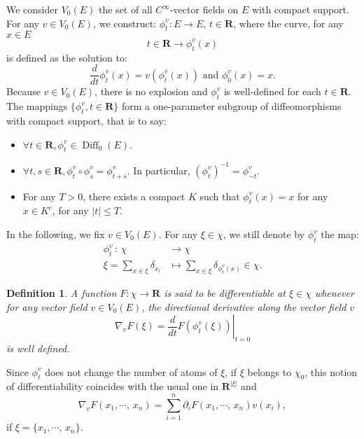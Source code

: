 \documentclass[11pt,a4paper]{amsart}
\newtheorem{Definition}{Definition}
\begin{document}
We consider $V_0(E)$ the set of all $C^{\infty}$-vector fields on $E$
with compact support. For any $v \in V_0(E)$, we construct: $\phi_t^v
: E \rightarrow E$, $t \in {{\mathbf R}}$, where the curve, for any $x \in E$
\begin{equation*}
  t \in {{\mathbf R}} \rightarrow \phi_t^v(x) 
\end{equation*}
is defined as the solution to:
\begin{equation*}
  \frac{d}{dt}\phi_t^v(x)=v(\phi^v_t(x)) \text{ and } \phi_0^v(x)=x.
\end{equation*}
Because $v \in V_0(E)$, there is no explosion and $\phi_t^v$ is
well-defined for each $t \in {{\mathbf R}}$. The mappings $\{\phi_t^v, t \in
{{\mathbf R}}\}$ form a one-parameter subgroup of diffeomorphisms with compact
support, that is to say:
\begin{itemize}
\item $\forall t \in {{\mathbf R}}, \phi_t^v \in {\operatorname{Diff}} _0(E)$.
\item $\forall t,s \in {{\mathbf R}}, \phi_t^v \circ \phi_s^v = \phi_{t+s}^v$. In
  particular, $(\phi_t^v)^{-1}=\phi_{-t}^v$.
\item For any $T>0$, there exists a compact $K$ such that
  $\phi_t^v(x)=x$ for any $x\in K^c$, for any $|t|\le T.$
\end{itemize}
In the following, we fix $v \in V_0(E)$. For any $\xi \in \chi$, we
still denote by $\phi_t^v$ the map:
\begin{align*}
  \phi_t^v\, :\, \chi & \longrightarrow \chi\\
  \xi=\sum_{x \in \xi}\delta_{x_i}&\longmapsto \sum_{x \in
    \xi}{\delta_{\phi_t^v(x)}} \in \chi.
\end{align*}
\begin{Definition}\label{def:gradient}
  A function $F :\chi \rightarrow {{\mathbf R}}$ is said to be differentiable at
  $\xi \in \chi$ whenever for any vector field $v\in V_0(E)$, the
  directional derivative along the vector field $v$
  \begin{equation*}
    \nabla_v F(\xi)=\left.\frac{d}{dt} F(\phi_t^v(\xi))\right|_{t=0}
  \end{equation*}
  is well defined.
\end{Definition}
Since $\phi_t^v$ does not change the number of atoms of $\xi$, if
$\xi$ belongs to $\chi_0$, this notion of differentiability coincides
with the usual one in ${{\mathbf R}}^{|\xi|}$ and
\begin{equation*}
  \nabla_v F(x_1,\cdots,\, x_n)=\sum_{i=1}^n \partial_i F(x_1,\cdots,\, x_n)v(x_i),
\end{equation*}
if $\xi=\{x_1,\cdots,\, x_n\}.$
\end{document}
